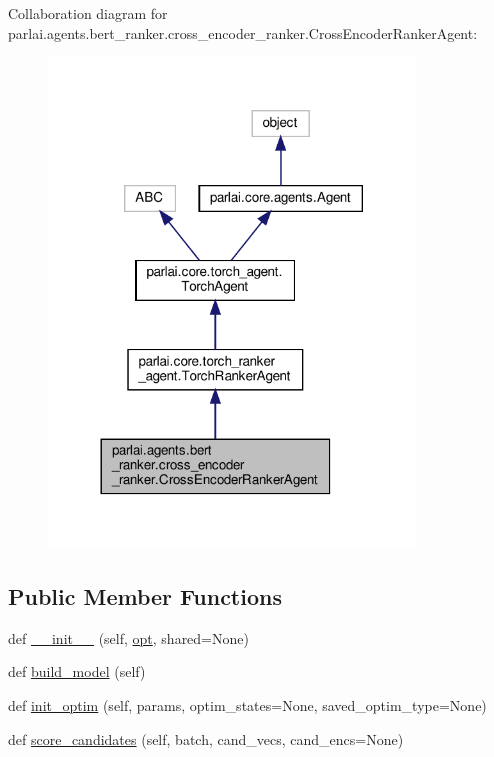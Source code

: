 Collaboration diagram for parlai.\+agents.\+bert\+\_\+ranker.\+cross\+\_\+encoder\+\_\+ranker.\+Cross\+Encoder\+Ranker\+Agent\+:
\nopagebreak
\begin{figure}[H]
\begin{center}
\leavevmode
\includegraphics[width=276pt]{d6/da0/classparlai_1_1agents_1_1bert__ranker_1_1cross__encoder__ranker_1_1CrossEncoderRankerAgent__coll__graph}
\end{center}
\end{figure}
\subsection*{Public Member Functions}
\begin{DoxyCompactItemize}
\item 
def \hyperlink{classparlai_1_1agents_1_1bert__ranker_1_1cross__encoder__ranker_1_1CrossEncoderRankerAgent_ab7f5e55dec9f12dc4e4dccc48c682e63}{\+\_\+\+\_\+init\+\_\+\+\_\+} (self, \hyperlink{classparlai_1_1core_1_1torch__agent_1_1TorchAgent_a785bb920cf8c8afc3e9bf6a8b77e335a}{opt}, shared=None)
\item 
def \hyperlink{classparlai_1_1agents_1_1bert__ranker_1_1cross__encoder__ranker_1_1CrossEncoderRankerAgent_a0754f7cf281a0223667ffb82c846a843}{build\+\_\+model} (self)
\item 
def \hyperlink{classparlai_1_1agents_1_1bert__ranker_1_1cross__encoder__ranker_1_1CrossEncoderRankerAgent_aedbc5976f08f86c9587c0b7486879846}{init\+\_\+optim} (self, params, optim\+\_\+states=None, saved\+\_\+optim\+\_\+type=None)
\item 
def \hyperlink{classparlai_1_1agents_1_1bert__ranker_1_1cross__encoder__ranker_1_1CrossEncoderRankerAgent_a8d75c4d4bddd44381b232a974469c432}{score\+\_\+candidates} (self, batch, cand\+\_\+vecs, cand\+\_\+encs=None)
\end{DoxyCompactItemize}
